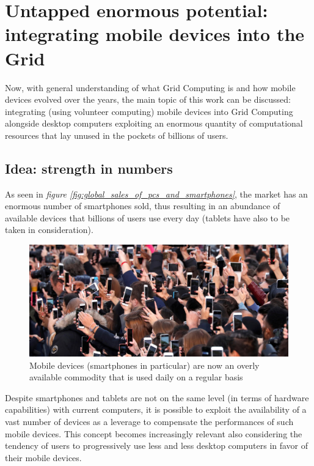\section{Untapped enormous potential: integrating mobile devices into the Grid}
Now, with general understanding of what Grid Computing is and how mobile devices evolved over the years, the main topic of this work can be discussed: integrating (using volunteer computing) mobile devices into Grid Computing alongside desktop computers exploiting an enormous quantity of computational resources that lay unused in the pockets of billions of users.

\subsection{Idea: strength in numbers}
As seen in \textit{figure \ref{fig:global_sales_of_pcs_and_smartphones}}, the market has an enormous number of smartphones sold, thus resulting in an abundance of available devices that billions of users use every day (tablets have also to be taken in consideration).
\vspace{10mm}

\begin{figure}[!ht]
    \centering
    \includegraphics[scale=1.35]{document/chapters/chapter_1/images/people_using_smartphones.jpg}
    \caption{Mobile devices (smartphones in particular) are now an overly available commodity that is used daily on a regular basis}
    \label{fig:people_using_smartphones}
\end{figure}

Despite smartphones and tablets are not on the same level (in terms of hardware capabilities) with current computers, it is possible to exploit the availability of a vast number of devices as a leverage to compensate the performances of such mobile devices.
This concept becomes increasingly relevant also considering the tendency of users to progressively use less and less desktop computers in favor of their mobile devices.

